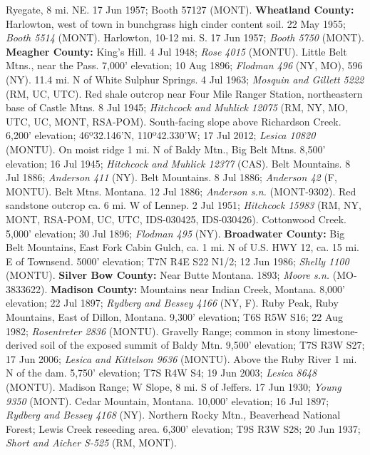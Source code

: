 Ryegate, 8 mi. NE.  17 Jun 1957; Booth 57127 (MONT).
  \textbf{Wheatland County:}
Harlowton, west of town in bunchgrass high cinder content soil. 22 May 1955;
\textit{Booth 5514} (MONT).
Harlowton, 10-12 mi. S. 17 Jun 1957; \textit{Booth 5750} (MONT).
  \textbf{Meagher County:}
King's Hill. 4 Jul 1948; \textit{Rose 4015} (MONTU).
Little Belt Mtns., near the Pass. 7,000' elevation; 10 Aug 1896;
\textit{Flodman 496} (NY, MO), 596 (NY).
11.4 mi. N of White Sulphur Springs. 4 Jul 1963;
\textit{Mosquin and Gillett 5222} (RM, UC, UTC).
Red shale outcrop near Four Mile Ranger Station, northeastern base of Castle
Mtns. 8 Jul 1945; \textit{Hitchcock and Muhlick 12075}
(RM, NY, MO, UTC, UC, MONT, RSA-POM).
South-facing slope above Richardson Creek. 6,200' elevation;
46º32.146'N, 110º42.330'W; 17 Jul 2012; \textit{Lesica 10820} (MONTU).
On moist ridge 1 mi. N of Baldy Mtn., Big Belt Mtns. 8,500' elevation;
16 Jul 1945; \textit{Hitchcock and Muhlick 12377} (CAS).
Belt Mountains. 8 Jul 1886; \textit{Anderson 411} (NY).
Belt Mountains. 8 Jul 1886; \textit{Anderson 42} (F, MONTU).
Belt Mtns. Montana. 12 Jul 1886; \textit{Anderson s.n.} (MONT-9302).
Red sandstone outcrop ca. 6 mi. W of Lennep. 2 Jul 1951;
\textit{Hitchcock 15983}
(RM, NY, MONT, RSA-POM, UC, UTC, IDS-030425, IDS-030426).
Cottonwood Creek. 5,000' elevation; 30 Jul 1896; \textit{Flodman 495} (NY).
  \textbf{Broadwater County:}
Big Belt Mountains, East Fork Cabin Gulch, ca. 1 mi. N of U.S. HWY 12, ca. 15
mi. E of Townsend. 5000' elevation; T7N R4E S22 N1/2; 12 Jun 1986;
\textit{Shelly 1100} (MONTU).
  \textbf{Silver Bow County:}
Near Butte Montana. 1893; \textit{Moore s.n.} (MO-3833622).
  \textbf{Madison County:}
Mountains near Indian Creek, Montana. 8,000' elevation; 22 Jul 1897;
\textit{Rydberg and Bessey 4166} (NY, F).
Ruby Peak, Ruby Mountains, East of Dillon, Montana. 9,300' elevation;
T6S R5W S16; 22 Aug 1982; \textit{Rosentreter 2836} (MONTU).
Gravelly Range; common in stony limestone-derived soil of the exposed summit of
Baldy Mtn. 9,500' elevation; T7S R3W S27; 17 Jun 2006;
\textit{Lesica and Kittelson 9636} (MONTU).
Above the Ruby River 1 mi. N of the dam. 5,750' elevation; T7S R4W S4;
19 Jun 2003; \textit{Lesica 8648} (MONTU).
Madison Range; W Slope, 8 mi. S of Jeffers. 17 Jun 1930;
\textit{Young 9350} (MONT).
Cedar Mountain, Montana. 10,000' elevation; 16 Jul 1897;
\textit{Rydberg and Bessey 4168} (NY).
Northern Rocky Mtn., Beaverhead National Forest; Lewis Creek reseeding area.
6,300' elevation; T9S R3W S28; 20 Jun 1937;
\textit{Short and Aicher S-525} (RM, MONT).
